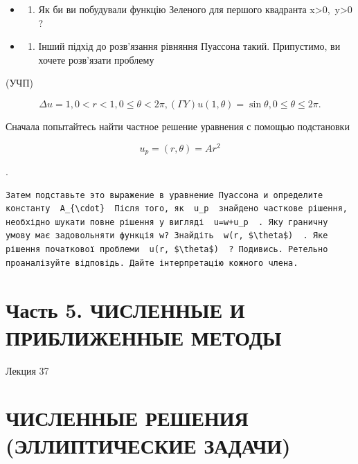 \documentclass[
  ukrainian,
]{article}
\providecommand{\tightlist}{%
  \setlength{\itemsep}{0pt}\setlength{\parskip}{0pt}}
\begin{document}
\begin{itemize}
\tightlist
\item
  \begin{enumerate}
  \def\labelenumi{\arabic{enumi}.}
  \setcounter{enumi}{3}
  \tightlist
  \item
    Як би ви побудували функцію Зеленого для першого квадранта
    x\textgreater0,~y\textgreater0 ?
  \end{enumerate}
\item
  \begin{enumerate}
  \def\labelenumi{\arabic{enumi}.}
  \setcounter{enumi}{4}
  \tightlist
  \item
    Інший підхід до розв'язання рівняння Пуассона такий. Припустимо, ви
    хочете розв'язати проблему
  \end{enumerate}
\end{itemize}

(УЧП)

\[
\Delta u = 1
,  0 < r < 1  ,  0 \le \theta < 2\pi  ,  (\Gamma Y)   u(1, \theta) = \sin \theta  ,  0 \le \theta \le 2\pi  .
\]

Сначала попытайтесь найти частное решение уравнения с помощью
подстановки

\[
u_p = (r, \theta) = Ar^2
\]

.

\begin{verbatim}
Затем подставьте это выражение в уравнение Пуассона и определите константу  A_{\cdot}  Після того, як  u_p  знайдено часткове рішення, необхідно шукати повне рішення у вигляді  u=w+u_p  . Яку граничну умову має задовольняти функція w? Знайдіть  w(r, $\theta$)  . Яке рішення початкової проблеми  u(r, $\theta$)  ? Подивись. Ретельно проаналізуйте відповідь. Дайте інтерпретацію кожного члена.
\end{verbatim}

\section{Часть 5. ЧИСЛЕННЫЕ И ПРИБЛИЖЕННЫЕ
МЕТОДЫ}\label{ux447ux430ux441ux442ux44c-5.-ux447ux438ux441ux43bux435ux43dux43dux44bux435-ux438-ux43fux440ux438ux431ux43bux438ux436ux435ux43dux43dux44bux435-ux43cux435ux442ux43eux434ux44b}

Лекция 37

\section{ЧИСЛЕННЫЕ РЕШЕНИЯ (ЭЛЛИПТИЧЕСКИЕ
ЗАДАЧИ)}\label{ux447ux438ux441ux43bux435ux43dux43dux44bux435-ux440ux435ux448ux435ux43dux438ux44f-ux44dux43bux43bux438ux43fux442ux438ux447ux435ux441ux43aux438ux435-ux437ux430ux434ux430ux447ux438}
\end{document}
